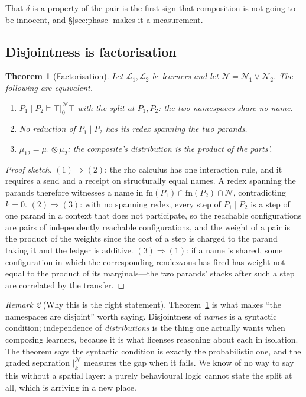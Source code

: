 \documentclass[11pt,a4paper]{article}
\theoremstyle{plain}
\newtheorem{theorem}{Theorem}
\theoremstyle{definition}
\theoremstyle{remark}
\newtheorem{remark}[theorem]{Remark}
\newcommand{\Lrn}{\mathcal{L}}
\newcommand{\Nsp}{\mathcal{N}}
\newcommand{\sep}[2]{\mathbin{\big|^{#1}_{#2}}}
\newcommand{\fn}{\mathrm{fn}}
\begin{document}
That $\delta$ is a property of the pair is the first sign that composition is not going to be
innocent, and \S\ref{sec:phase} makes it a measurement.

\subsection{Disjointness is factorisation}

\begin{theorem}[Factorisation]\label{thm:factor}
Let $\Lrn_1, \Lrn_2$ be learners and let $\Nsp = \Nsp_1 \vee \Nsp_2$. The following are
equivalent.
\begin{enumerate}[label=(\arabic*)]
\item $P_1 \mid P_2 \models \top \sep{\Nsp}{0} \top$ with the split at $P_1, P_2$: the two
namespaces share no name.
\item No reduction of $P_1 \mid P_2$ has its redex spanning the two parands.
\item $\mu_{12} = \mu_1 \otimes \mu_2$: the composite's distribution is the product of the
parts'.
\end{enumerate}
\end{theorem}

\begin{proof}[Proof sketch]
$(1)\Rightarrow(2)$: the rho calculus has one interaction rule, and it requires a send and a
receipt on structurally equal names. A redex spanning the parands therefore witnesses a name in
$\fn(P_1) \cap \fn(P_2) \cap \Nsp$, contradicting $k=0$. $(2)\Rightarrow(3)$: with no spanning
redex, every step of $P_1\mid P_2$ is a step of one parand in a context that does not participate,
so the reachable configurations are pairs of independently reachable configurations, and the
weight of a pair is the product of the weights since the cost of a step is charged to the parand
taking it and the ledger is additive. $(3)\Rightarrow(1)$: if a name is shared, some
configuration in which the corresponding rendezvous has fired has weight not equal to the product
of its marginals---the two parands' stacks after such a step are correlated by the transfer.
\end{proof}

\begin{remark}[Why this is the right statement]
Theorem~\ref{thm:factor} is what makes ``the namespaces are disjoint'' worth saying. Disjointness
of \emph{names} is a syntactic condition; independence of \emph{distributions} is the thing one
actually wants when composing learners, because it is what licenses reasoning about each in
isolation. The theorem says the syntactic condition is exactly the probabilistic one, and the
graded separation $\sep{\Nsp}{k}$ measures the gap when it fails. We know of no way to say this
without a spatial layer: a purely behavioural logic cannot state the split at all, which is
\cite[Rem.~5]{classifier} arriving in a new place.
\end{remark}
\end{document}
